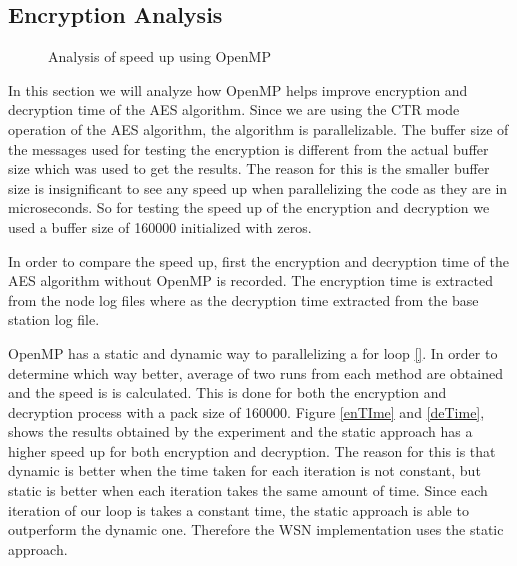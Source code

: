 \documentclass[conference]{IEEEtran}
\begin{document}
	\subsection{Encryption Analysis}	\label{encry}
	
		
	\begin{figure}[!h]
		\centering
		\caption{Analysis of speed up using OpenMP}
	\end{figure}	
	
	In this section we will analyze how OpenMP helps improve encryption and decryption time of the AES algorithm. Since we are using the CTR mode operation of the AES algorithm, the algorithm is parallelizable. 	The buffer size of the messages used for testing the encryption is different from the actual buffer size which was used to get the results. The reason for this is the smaller buffer size is insignificant to see any speed up when parallelizing the code as they are in microseconds. So for testing the speed up of the encryption and decryption we used a buffer size of 160000 initialized with zeros.
	
	In order to compare the speed up, first the encryption and decryption time of the AES algorithm without OpenMP is recorded. The encryption time is extracted from the node log files where as the decryption time extracted from the base station log file. 
	
	OpenMP has a static and dynamic way to parallelizing a for loop \ref{}. In order to determine which way better, average of two runs from each method are obtained and the speed is is calculated. This is done for both the encryption and decryption process with a pack size of 160000. Figure \ref{enTIme} and \ref{deTime}, shows the results obtained by the experiment and the static approach has a higher speed up for both encryption and decryption. The reason for this is that dynamic is better when the time taken for each iteration is not constant, but static is better when each iteration takes the same amount of time. Since each iteration of our loop is takes a constant time, the static approach is able to outperform the dynamic one. Therefore the WSN implementation uses the static approach.
\end{document}
